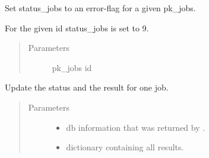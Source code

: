 \documentclass[letterpaper,10pt,english]{sphinxmanual}
\begin{document}
\begin{fulllineitems}
\begin{fulllineitems}
\begin{quote}
\begin{description}
\end{description}\end{quote}

\end{fulllineitems}


\begin{fulllineitems}
\label{\detokenize{api:db_interface.DBInterface.set_error_state}}
Set status\_jobs to an error-flag for a given pk\_jobs.

For the given id status\_jobs is set to 9.
\begin{quote}\begin{description}
\item[{Parameters}] \leavevmode
{} \textendash{} pk\_jobs id

\end{description}\end{quote}

\end{fulllineitems}


\begin{fulllineitems}
\label{\detokenize{api:db_interface.DBInterface.update_results}}
Update the status and the result for one job.
\begin{quote}\begin{description}
\item[{Parameters}] \leavevmode\begin{itemize}
\item {} 
 \textendash{} db information that was returned by {\hyperref[\detokenize{api:db_interface.DBInterface.get_job}]{}}.

\item {} 
 \textendash{} dictionary containing all results.

\end{itemize}

\end{description}\end{quote}

\end{fulllineitems}


\end{fulllineitems}
\end{document}
